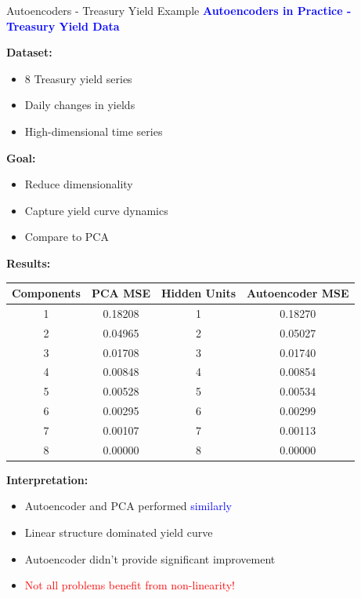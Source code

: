 \documentclass[8pt]{beamer}
\begin{document}
	\begin{frame}{Autoencoders - Treasury Yield Example}
		\fontsize{6.5}{7.5}\selectfont
		\textcolor{blue}{\textbf{Autoencoders in Practice - Treasury Yield Data}}
		
		\textbf{Dataset:}
		\begin{itemize}
			\item 8 Treasury yield series
			\item Daily changes in yields
			\item High-dimensional time series
		\end{itemize}
		
		\textbf{Goal:}
		\begin{itemize}
			\item Reduce dimensionality
			\item Capture yield curve dynamics
			\item Compare to PCA
		\end{itemize}
		
		\textbf{Results:}
		
		\begin{tabular}{|c|c|c|c|}
			\hline
			\textbf{Components} & \textbf{PCA MSE} & \textbf{Hidden Units} & \textbf{Autoencoder MSE} \\
			\hline
			1 & 0.18208 & 1 & 0.18270 \\
			\hline
			2 & 0.04965 & 2 & 0.05027 \\
			\hline
			3 & 0.01708 & 3 & 0.01740 \\
			\hline
			4 & 0.00848 & 4 & 0.00854 \\
			\hline
			5 & 0.00528 & 5 & 0.00534 \\
			\hline
			6 & 0.00295 & 6 & 0.00299 \\
			\hline
			7 & 0.00107 & 7 & 0.00113 \\
			\hline
			8 & 0.00000 & 8 & 0.00000 \\
			\hline
		\end{tabular}
		
		\textbf{Interpretation:}
		\begin{itemize}
			\item Autoencoder and PCA performed \textcolor{blue}{similarly}
			\item Linear structure dominated yield curve
			\item Autoencoder didn't provide significant improvement
			\item \textcolor{red}{Not all problems benefit from non-linearity!}
		\end{itemize}
	\end{frame}
	
\end{document}
